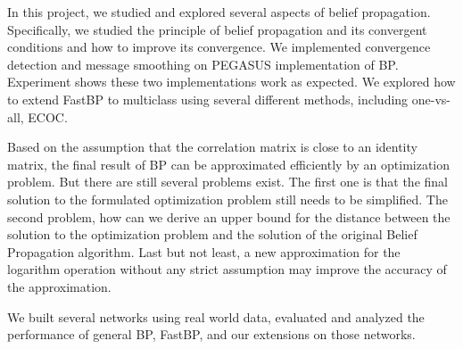 In this project, we studied and explored several aspects of belief propagation. Specifically, we studied the principle of belief propagation and its convergent conditions and how to improve its convergence. We implemented convergence detection and message smoothing on PEGASUS implementation of BP. Experiment shows these two implementations work as expected. We explored how to extend FastBP to multiclass using several different methods, including one-vs-all, ECOC. 

Based on the assumption that the correlation matrix is close to an identity matrix, the final result of BP can be approximated efficiently by an optimization problem. But there are still several problems exist. The first one is that the final solution to the formulated optimization problem still needs to be simplified. The second problem, how can we derive an upper bound for the distance between the solution to the optimization problem and the solution of the original Belief Propagation algorithm. Last but not least, a new approximation for the logarithm operation without any strict assumption may improve the accuracy of the approximation.

We built several networks using real world data, evaluated and analyzed the performance of general BP, FastBP, and our extensions on those networks.
